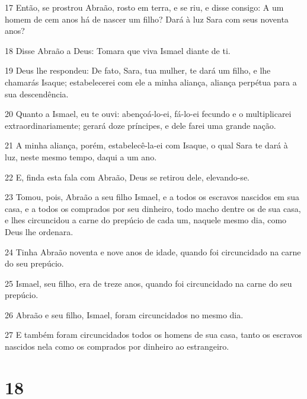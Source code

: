 \par 17 Então, se prostrou Abraão, rosto em terra, e se riu, e disse consigo: A um homem de cem anos há de nascer um filho? Dará à luz Sara com seus noventa anos?
\par 18 Disse Abraão a Deus: Tomara que viva Ismael diante de ti.
\par 19 Deus lhe respondeu: De fato, Sara, tua mulher, te dará um filho, e lhe chamarás Isaque; estabelecerei com ele a minha aliança, aliança perpétua para a sua descendência.
\par 20 Quanto a Ismael, eu te ouvi: abençoá-lo-ei, fá-lo-ei fecundo e o multiplicarei extraordinariamente; gerará doze príncipes, e dele farei uma grande nação.
\par 21 A minha aliança, porém, estabelecê-la-ei com Isaque, o qual Sara te dará à luz, neste mesmo tempo, daqui a um ano.
\par 22 E, finda esta fala com Abraão, Deus se retirou dele, elevando-se.
\par 23 Tomou, pois, Abraão a seu filho Ismael, e a todos os escravos nascidos em sua casa, e a todos os comprados por seu dinheiro, todo macho dentre os de sua casa, e lhes circuncidou a carne do prepúcio de cada um, naquele mesmo dia, como Deus lhe ordenara.
\par 24 Tinha Abraão noventa e nove anos de idade, quando foi circuncidado na carne do seu prepúcio.
\par 25 Ismael, seu filho, era de treze anos, quando foi circuncidado na carne do seu prepúcio.
\par 26 Abraão e seu filho, Ismael, foram circuncidados no mesmo dia.
\par 27 E também foram circuncidados todos os homens de sua casa, tanto os escravos nascidos nela como os comprados por dinheiro ao estrangeiro.

\chapter{18}

